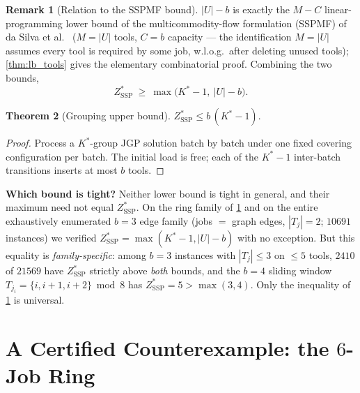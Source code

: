 \documentclass[11pt,a4paper]{article}
\theoremstyle{plain}
\newtheorem{theorem}{Theorem}[section]
\theoremstyle{definition}
\newtheorem{remark}[theorem]{Remark}
\newcommand{\Kstar}{K^{*}}
\newcommand{\ZSSP}{Z_{\mathrm{SSP}}^{*}}
\begin{document}
\begin{remark}[Relation to the SSPMF bound]
\label{rem:msc}
$|U|-b$ is exactly the $M-C$ linear-programming lower bound of the multicommodity-flow
formulation (SSPMF) of da Silva et al.\ \cite{daSilva2024} ($M=|U|$ tools, $C=b$ capacity
--- the identification $M=|U|$ assumes every tool is required by some job, w.l.o.g.\ after
deleting unused tools);
\cref{thm:lb_tools} gives the elementary combinatorial proof. Combining the two bounds,
\[
  \boxed{\ \ZSSP\ \ge\ \max\bigl(\Kstar-1,\ |U|-b\bigr).\ }
\]
\end{remark}

\begin{thmbox}
\begin{theorem}[Grouping upper bound]
\label{thm:ub}
$\ZSSP\le b\,(\Kstar-1).$
\end{theorem}
\end{thmbox}
\begin{proofbox}
\begin{proof}
Process a $\Kstar$-group JGP solution batch by batch under one fixed covering
configuration per batch. The initial load is free; each of the $\Kstar-1$ inter-batch
transitions inserts at most $b$ tools.
\end{proof}
\end{proofbox}

\begin{warnbox}
\textbf{Which bound is tight?}
Neither lower bound is tight in general, and their maximum need not equal $\ZSSP$.
On the ring family of \cref{sec:counterexample} and on the entire exhaustively
enumerated $b=3$ edge family (jobs $=$ graph edges, $|T_j|=2$; $10691$ instances)
we verified $\ZSSP=\max(\Kstar-1,|U|-b)$ with no exception. But this equality is
\emph{family-specific}: among $b=3$ instances with $|T_j|\le 3$ on $\le5$ tools,
$2410$ of $21569$ have $\ZSSP$ strictly above \emph{both} bounds, and the $b=4$
sliding window $T_{j_i}=\{i,i{+}1,i{+}2\}\bmod 8$ has $\ZSSP=5>\max(3,4)$. Only the
inequality of \cref{rem:msc} is universal.
\end{warnbox}

\section{A Certified Counterexample: the $6$-Job Ring}
\label{sec:counterexample}
\end{document}
